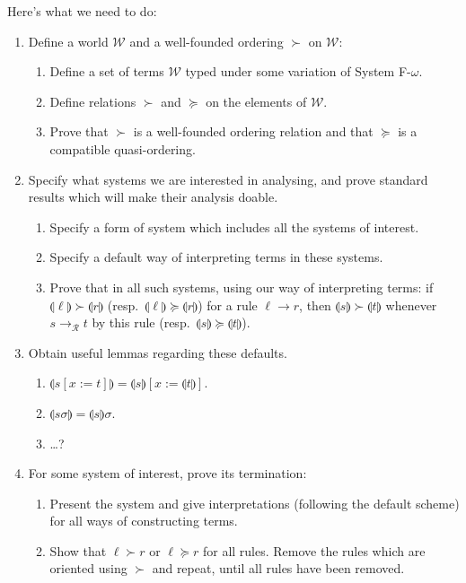 \documentclass[runningheads,a4paper]{llncs}
\newcommand{\World}{\mathcal{W}}
\newcommand{\Rules}{\mathcal{R}}
\newcommand{\interpret}[1]{\llparenthesis #1 \rrparenthesis}
\newcommand{\arr}[1]{\longrightarrow_{#1}}
\begin{document}
Here's what we need to do:
\begin{enumerate}
\item Define a world $\World$ and a well-founded ordering $\succ$ on
  $\World$:
  \begin{enumerate}
  \item Define a set of terms $\World$ typed under some variation of
    System F-$\omega$.
  \item Define relations $\succ$ and $\succeq$ on the elements of $\World$.
  \item Prove that $\succ$ is a well-founded ordering relation and that
    $\succeq$ is a compatible quasi-ordering.
  \end{enumerate}
\item Specify what systems we are interested in analysing, and prove
  standard results which will make their analysis doable.
  \begin{enumerate}
  \item Specify a form of system which includes all the systems of interest.
  \item Specify a default way of interpreting terms in these systems.
  \item Prove that in all such systems, using our way of interpreting
    terms: if $\interpret{\ell} \succ \interpret{r}$ (resp.\ $\interpret{
    \ell} \succeq \interpret{r}$) for a rule  $\ell \to r$, then
    $\interpret{s} \succ \interpret{t}$ whenever $s \arr{\Rules} t$ by
    this rule (resp.\ $\interpret{s} \succeq \interpret{t}$).
  \end{enumerate}
\item Obtain useful lemmas regarding these defaults.
  \begin{enumerate}
  \item $\interpret{s[x:=t]} = \interpret{s}[x:=\interpret{t}]$.
  \item $\interpret{s\sigma} = \interpret{s}\sigma$.
  \item \dots?
  \end{enumerate}
\item For some system of interest, prove its termination:
  \begin{enumerate}
  \item Present the system and give interpretations (following the
    default scheme) for all ways of constructing terms.
  \item Show that $\ell \succ r$ or $\ell \succeq r$ for all rules.
    Remove the rules which are oriented using $\succ$ and repeat,
    until all rules have been removed.
  \end{enumerate}
\end{enumerate}
\end{document}
